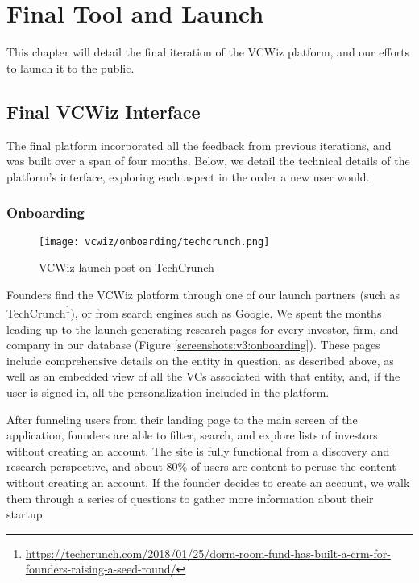\chapter{Final Tool and Launch}
\label{ch:ch4}

This chapter will detail the final iteration of the VCWiz platform, and our efforts to launch it to the public.

\section{Final VCWiz Interface}

The final platform incorporated all the feedback from previous iterations, and was built over a span of four months. Below, we detail the technical details of the platform's interface, exploring each aspect in the order a new user would.

\subsection{Onboarding}

\begin{figure}[ht]
  \centering
  \texttt{[image: vcwiz/onboarding/techcrunch.png]}
  \caption*{VCWiz launch post on TechCrunch}
\end{figure}

Founders find the VCWiz platform through one of our launch partners (such as TechCrunch\footnote{\url{https://techcrunch.com/2018/01/25/dorm-room-fund-has-built-a-crm-for-founders-raising-a-seed-round/}}), or from search engines such as Google. We spent the months leading up to the launch generating research pages for every investor, firm, and company in our database (Figure \ref{screenshots:v3:onboarding}). These pages include comprehensive details on the entity in question, as described above, as well as an embedded view of all the VCs associated with that entity, and, if the user is signed in, all the personalization included in the platform.

After funneling users from their landing page to the main screen of the application, founders are able to filter, search, and explore lists of investors without creating an account. The site is fully functional from a discovery and research perspective, and about 80\% of users are content to peruse the content without creating an account. If the founder decides to create an account, we walk them through a series of questions to gather more information about their startup.


